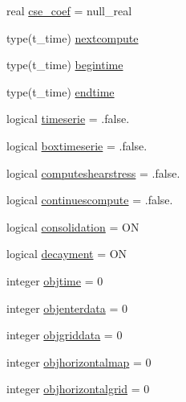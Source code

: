 \begin{DoxyCompactItemize}
real \mbox{\hyperlink{structmoduleconsolidation_1_1t__consolidation_af777b5e4f56488816f9ec77c71b0a2b1}{cse\+\_\+coef}} = null\+\_\+real
\item 
type(t\+\_\+time) \mbox{\hyperlink{structmoduleconsolidation_1_1t__consolidation_a93f8daf57fd766f97e133fc3b2558ee0}{nextcompute}}
\item 
type(t\+\_\+time) \mbox{\hyperlink{structmoduleconsolidation_1_1t__consolidation_a8bbb8b15e0e07d9f52b79ac787c22c6c}{begintime}}
\item 
type(t\+\_\+time) \mbox{\hyperlink{structmoduleconsolidation_1_1t__consolidation_aaf399c17154128b61b8f9e27463466f3}{endtime}}
\item 
logical \mbox{\hyperlink{structmoduleconsolidation_1_1t__consolidation_a03dd7a81b51cbb0ea7bfcecfc8c2d72d}{timeserie}} = .false.
\item 
logical \mbox{\hyperlink{structmoduleconsolidation_1_1t__consolidation_ad5707a193bb0b4489a810231eb8f2041}{boxtimeserie}} = .false.
\item 
logical \mbox{\hyperlink{structmoduleconsolidation_1_1t__consolidation_a9519a1dfb0d19ce77be384ebc9a2fd31}{computeshearstress}} = .false.
\item 
logical \mbox{\hyperlink{structmoduleconsolidation_1_1t__consolidation_a70260a3548666bb82e0babd3827aee9e}{continuescompute}} = .false.
\item 
logical \mbox{\hyperlink{structmoduleconsolidation_1_1t__consolidation_adad379a7205ac5eb2888ec8bf728c6eb}{consolidation}} = ON
\item 
logical \mbox{\hyperlink{structmoduleconsolidation_1_1t__consolidation_a30bd7a75e6d00c9b9de5a5e3e1c06939}{decayment}} = ON
\item 
integer \mbox{\hyperlink{structmoduleconsolidation_1_1t__consolidation_a1228512b377cb6bf4e80810669cbf91a}{objtime}} = 0
\item 
integer \mbox{\hyperlink{structmoduleconsolidation_1_1t__consolidation_a84d564d5b777fcdbaf168d3263dcd693}{objenterdata}} = 0
\item 
integer \mbox{\hyperlink{structmoduleconsolidation_1_1t__consolidation_a55778ede79d08dca42b79d6fa4a17197}{objgriddata}} = 0
\item 
integer \mbox{\hyperlink{structmoduleconsolidation_1_1t__consolidation_a328f845148908396a55e5d9ab9671e5f}{objhorizontalmap}} = 0
\item 
integer \mbox{\hyperlink{structmoduleconsolidation_1_1t__consolidation_acbfcdb2777749d2d1c1e49f8a48664f3}{objhorizontalgrid}} = 0
\item 

\end{DoxyCompactItemize}
